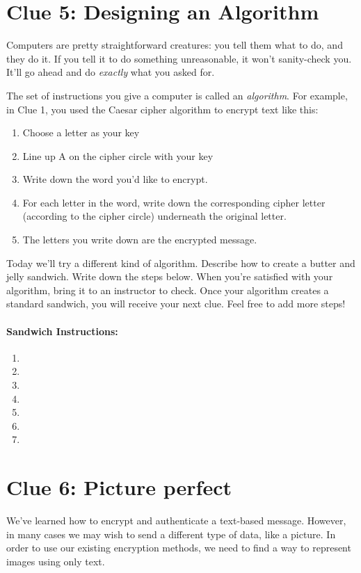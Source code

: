 \documentclass{article}
\begin{document}
\newpage

\section*{Clue 5: Designing an Algorithm}
Computers are pretty straightforward creatures: you tell them what to do, and they do it. If you tell it to do something unreasonable, it won't sanity-check you. It'll go ahead and do \textit{exactly} what you asked for.

The set of instructions you give a computer is called an \textit{algorithm}. For example, in Clue 1, you used the Caesar cipher algorithm to encrypt text like this:
\begin{enumerate}[noitemsep]
  \item Choose a letter as your key
  \item Line up A on the cipher circle with your key
  \item Write down the word you'd like to encrypt.
  \item For each letter in the word, write down the corresponding cipher letter (according to the cipher circle) underneath the original letter.
  \item The letters you write down are the encrypted message.
\end{enumerate}

Today we'll try a different kind of algorithm. Describe how to create a butter and jelly sandwich. Write down the steps below. When you're satisfied with your algorithm, bring it to an instructor to check. Once your algorithm creates a standard sandwich, you will receive your next clue. Feel free to add more steps!

\paragraph{Sandwich Instructions:}
\begin{enumerate}
  \item
  \item
  \item
  \item
  \item
  \item
  \item
\end{enumerate}

\newpage

\section*{Clue 6: Picture perfect}
We've learned how to encrypt and authenticate a text-based message. However, in many cases we may wish to send a different type of data, like a picture. In order to use our existing encryption methods, we need to find a way to represent images using only text.
\end{document}
